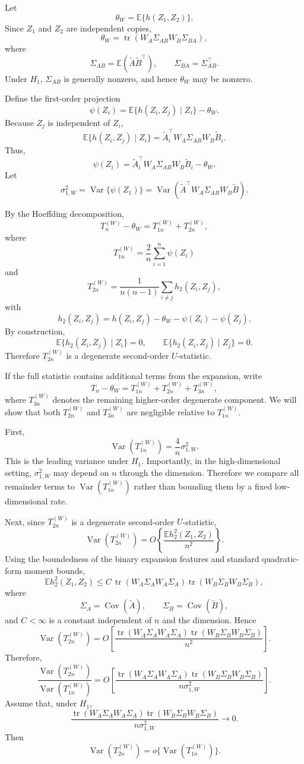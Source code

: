 \documentclass[12pt,reqno,oneside]{amsbook}
\theoremstyle{definition}
\theoremstyle{remark}
\begin{document}
Let
\[
\theta_W
=
\mathbb E\{h(Z_1,Z_2)\}.
\]
Since $Z_1$ and $Z_2$ are independent copies,
\[
\theta_W
=
\operatorname{tr}
\left(
W_A\Sigma_{AB}W_B\Sigma_{BA}
\right),
\]
where
\[
\Sigma_{AB}=\mathbb E(\tilde A\tilde B^\top),
\qquad
\Sigma_{BA}=\Sigma_{AB}^\top .
\]
Under $H_1$, $\Sigma_{AB}$ is generally nonzero, and hence $\theta_W$ may be
nonzero.

Define the first-order projection
\[
\psi(Z_i)
=
\mathbb E\{h(Z_i,Z_j)\mid Z_i\}-\theta_W .
\]
Because $Z_j$ is independent of $Z_i$,
\[
\mathbb E\{h(Z_i,Z_j)\mid Z_i\}
=
\tilde A_i^\top W_A\Sigma_{AB}W_B\tilde B_i .
\]
Thus,
\[
\psi(Z_i)
=
\tilde A_i^\top W_A\Sigma_{AB}W_B\tilde B_i-\theta_W .
\]
Let
\[
\sigma_{1,W}^2
=
\operatorname{Var}\{\psi(Z_1)\}
=
\operatorname{Var}
\left(
\tilde A^\top W_A\Sigma_{AB}W_B\tilde B
\right).
\]

By the Hoeffding decomposition,
\[
T_n^{(W)}-\theta_W
=
T_{1n}^{(W)}+T_{2n}^{(W)},
\]
where
\[
T_{1n}^{(W)}
=
\frac{2}{n}\sum_{i=1}^n \psi(Z_i)
\]
and
\[
T_{2n}^{(W)}
=
\frac{1}{n(n-1)}
\sum_{i\ne j} h_2(Z_i,Z_j),
\]
with
\[
h_2(Z_i,Z_j)
=
h(Z_i,Z_j)-\theta_W-\psi(Z_i)-\psi(Z_j).
\]
By construction,
\[
\mathbb E\{h_2(Z_i,Z_j)\mid Z_i\}=0,
\qquad
\mathbb E\{h_2(Z_i,Z_j)\mid Z_j\}=0.
\]
Therefore $T_{2n}^{(W)}$ is a degenerate second-order $U$-statistic.

If the full statistic contains additional terms from the expansion, write
\[
T_n-\theta_W
=
T_{1n}^{(W)}+T_{2n}^{(W)}+T_{3n}^{(W)},
\]
where $T_{3n}^{(W)}$ denotes the remaining higher-order degenerate component.
We will show that both $T_{2n}^{(W)}$ and $T_{3n}^{(W)}$ are negligible relative
to $T_{1n}^{(W)}$.

First,
\[
\operatorname{Var}(T_{1n}^{(W)})
=
\frac{4}{n}\sigma_{1,W}^2.
\]
This is the leading variance under $H_1$. Importantly, in the
high-dimensional setting, $\sigma_{1,W}^2$ may depend on $n$ through the
dimension. Therefore we compare all remainder terms to
$\operatorname{Var}(T_{1n}^{(W)})$ rather than bounding them by a fixed
low-dimensional rate.

Next, since $T_{2n}^{(W)}$ is a degenerate second-order $U$-statistic,
\[
\operatorname{Var}(T_{2n}^{(W)})
=
O\left\{
\frac{\mathbb E h_2^2(Z_1,Z_2)}{n^2}
\right\}.
\]
Using the boundedness of the binary expansion features and standard
quadratic-form moment bounds,
\[
\mathbb E h_2^2(Z_1,Z_2)
\le
C\,
\operatorname{tr}(W_A\Sigma_AW_A\Sigma_A)
\operatorname{tr}(W_B\Sigma_BW_B\Sigma_B),
\]
where
\[
\Sigma_A=\operatorname{Cov}(\tilde A),
\qquad
\Sigma_B=\operatorname{Cov}(\tilde B),
\]
and $C<\infty$ is a constant independent of $n$ and the dimension. Hence
\[
\operatorname{Var}(T_{2n}^{(W)})
=
O\left[
\frac{
\operatorname{tr}(W_A\Sigma_AW_A\Sigma_A)
\operatorname{tr}(W_B\Sigma_BW_B\Sigma_B)
}{n^2}
\right].
\]
Therefore,
\[
\frac{
\operatorname{Var}(T_{2n}^{(W)})
}{
\operatorname{Var}(T_{1n}^{(W)})
}
=
O\left[
\frac{
\operatorname{tr}(W_A\Sigma_AW_A\Sigma_A)
\operatorname{tr}(W_B\Sigma_BW_B\Sigma_B)
}{
n\sigma_{1,W}^2
}
\right].
\]
Assume that, under $H_1$,
\[
\frac{
\operatorname{tr}(W_A\Sigma_AW_A\Sigma_A)
\operatorname{tr}(W_B\Sigma_BW_B\Sigma_B)
}{
n\sigma_{1,W}^2
}
\to 0.
\tag{A1}
\]
Then
\[
\operatorname{Var}(T_{2n}^{(W)})
=
o\{\operatorname{Var}(T_{1n}^{(W)})\}.
\]
\end{document}
